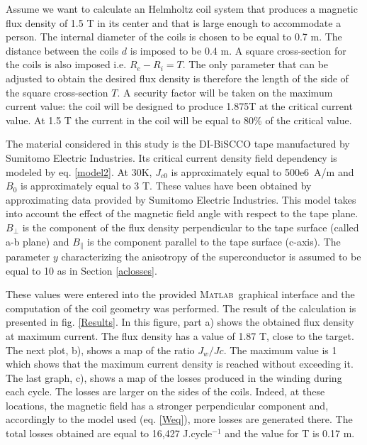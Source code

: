\documentclass{ws-jmrr}
\newcommand{\MATLAB}{{\textsc{Matlab}}}
\begin{document}
\begin{multicols}{2}
Assume we want to calculate an Helmholtz coil system that produces a magnetic flux density of 1.5 T in its center and that is large enough to accommodate a person. The internal diameter of the coils is chosen to be equal to 0.7 m. The distance between the coils $d$ is imposed to be 0.4 m. A square cross-section for the coils is also imposed i.e. $R_e-R_i=T$. The only parameter that can be adjusted to obtain the desired flux density is therefore the length of the side of the square cross-section $T$. A security factor will be taken on the maximum current value: the coil will be designed to produce 1.875T at the critical current value. At 1.5 T the current in the coil will be equal to 80\% of the critical value.\par
The material considered in this study is the DI-BiSCCO tape manufactured by Sumitomo Electric Industries. Its critical current density field dependency is modeled by eq. \ref{model2}. At 30K, $J_{c0}$ is approximately equal to 500e6~A/m and $B_0$ is approximately equal to 3 T. These values have been obtained by approximating data provided by Sumitomo Electric Industries. This model takes into account the effect of the magnetic field angle with respect to the tape plane. $B_{\perp}$ is the component of the flux density perpendicular to the tape surface (called a-b plane) and $B_{\parallel}$ is the component parallel to the tape surface (c-axis). The parameter $y$ characterizing the anisotropy of the superconductor is assumed to be equal to 10 as in Section \ref{aclosses}.\par
These values were entered into the provided \MATLAB ~graphical interface and the computation of the coil geometry was performed. The result of the calculation is presented in fig. \ref{Results}. In this figure, part a) shows the obtained flux density at maximum current. The flux density has a value of 1.87 T, close to the target. The next plot, b), shows a map of the ratio $J_w/Jc$. The maximum value is 1 which shows that the maximum current density is reached without exceeding it. The last graph, c), shows a map of the losses produced in the winding during each cycle. The losses are larger on the sides of the coils. Indeed, at these locations, the magnetic field has a stronger perpendicular component and, accordingly to the model used (eq. \ref{Weq}), more losses are generated there. The total losses obtained are equal to 16,427 J.cycle$^{-1}$ and the value for T is 0.17 m.

\end{multicols}
\end{document}
